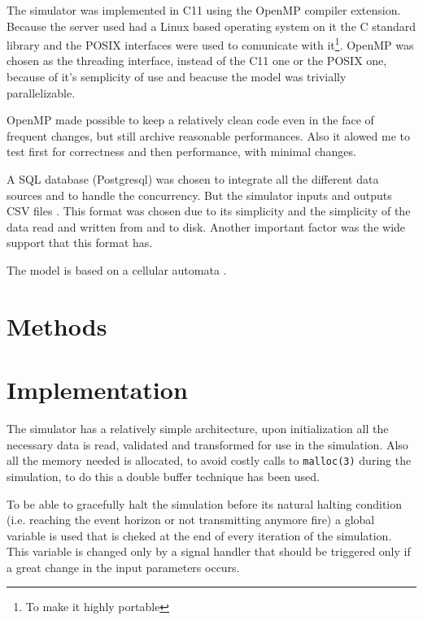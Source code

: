 \documentclass[draft]{article}
\begin{document}
The simulator was implemented in C11 using the OpenMP compiler extension.
Because the server used had a Linux based operating system on it the C standard
library and the POSIX interfaces were used to comunicate with it\footnote{To
make it highly portable}. OpenMP was chosen as the threading interface, instead
of the C11 one or the POSIX one, because of it's semplicity of use and beacuse
the model was trivially parallelizable.

OpenMP made possible to keep a relatively clean code even in the face of
frequent changes, but still archive reasonable performances. Also it alowed me
to test first for correctness and then performance, with minimal changes.

A SQL database (Postgresql) was chosen to integrate all the different data
sources and to handle the concurrency. But the simulator inputs and outputs CSV
files \cite{csv}. This format was chosen due to its simplicity and the
simplicity of the data read and written from and to disk. Another important
factor was the wide support that this format has.

The model is based on a cellular automata \cite{gol}.

\section{Methods}\label{sec:methods}


\section{Implementation}\label{sec:implementation}


The simulator has a relatively simple architecture, upon initialization all the
necessary data is read, validated and transformed for use in the simulation.
Also all the memory needed is allocated, to avoid costly calls to
\texttt{malloc(3)} during the simulation, to do this a double buffer technique
has been used.


To be able to gracefully halt the simulation before its natural halting
condition (i.e. reaching the event horizon or not transmitting anymore fire) a
global variable is used that is cheked at the end of every iteration of the
simulation. This variable is changed only by a signal handler that should be
triggered only if a great change in the input parameters occurs.
\end{document}
